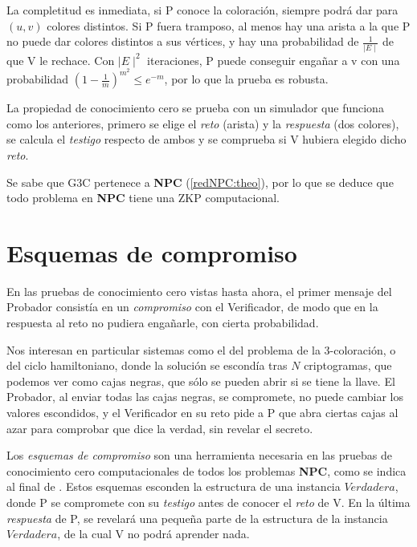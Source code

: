 La completitud es inmediata, si P conoce la coloración, siempre podrá dar para $(u,v)$ colores distintos. Si P fuera tramposo, al menos hay una arista a la que P no puede dar colores distintos a sus vértices, y hay una probabilidad de $\frac{1}{\mid E \mid}$ de que V le rechace. Con $\mid E \mid ^2$ iteraciones, P puede conseguir engañar a v con una probabilidad $(1-\frac{1}{m})^{m^2} \leq e^{-m}$, por lo que la prueba es robusta.

La propiedad de conocimiento cero se prueba con un simulador que funciona como los anteriores, primero se elige el \textit{reto} (arista) y la \textit{respuesta} (dos colores), se calcula el \textit{testigo} respecto de ambos y se comprueba si V hubiera elegido dicho \textit{reto}.

\hfil

Se sabe que G3C pertenece a \textbf{NPC} (\ref{redNPC:theo}), por lo que se deduce que todo problema en \textbf{NPC} tiene una ZKP computacional.


\section{Esquemas de compromiso}\label{bitcommitment}

En las pruebas de conocimiento cero vistas hasta ahora, el primer mensaje del Probador consistía en un \textit{compromiso} con el Verificador, de modo que en la respuesta al reto no pudiera engañarle, con cierta probabilidad.

Nos interesan en particular sistemas como el del problema de la 3-coloración, o del ciclo hamiltoniano, donde la solución se escondía tras $N$ criptogramas, que podemos ver como cajas negras, que sólo se pueden abrir si se tiene la llave. El Probador, al enviar todas las cajas negras, se compromete, no puede cambiar los valores escondidos, y el Verificador en su reto pide a P que abra ciertas cajas al azar para comprobar que dice la verdad, sin revelar el secreto.

Los \textit{esquemas de compromiso} son una herramienta necesaria en las pruebas de conocimiento cero computacionales de todos los problemas \textbf{NPC}, como se indica al final de \citep{blum}. Estos esquemas esconden la estructura de una instancia $Verdadera$, donde P se compromete con su \textit{testigo} antes de conocer el \textit{reto} de V. En la última \textit{respuesta} de P, se revelará una pequeña parte de la estructura de la instancia $Verdadera$, de la cual V no podrá aprender nada.



